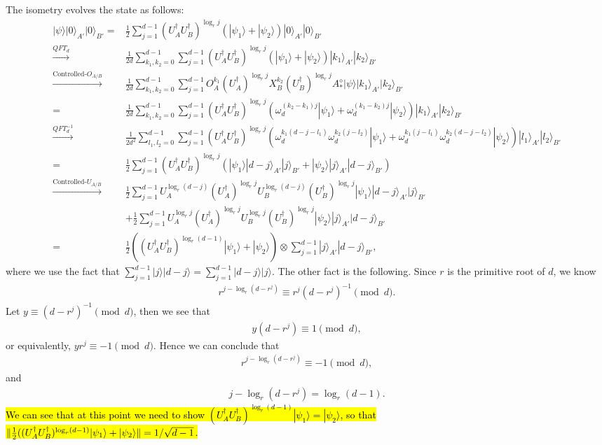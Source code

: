 \documentclass[11pt,letterpaper]{article}
\newcommand{\ket}[1]{|#1\rangle}
\newcommand{\x}{\otimes}
\newcommand{\ct}{^{\dagger}}
\DeclarePairedDelimiter{\norm}{\lVert}{\rVert}
\newcommand{\1}{\mathbb{1}}
\newcommand{\appd}[1]{\simeq_{#1}}
\theoremstyle{definition}
\begin{document}
The isometry evolves the state as follows:
	\begin{align}
		\ket{\psi} \ket{0}_{A'}\ket{0}_{B'} %
		=& \frac{1}{2} \sum_{j=1}^{d-1} (U_A\ct U_B\ct)^{\log_r j} (\ket{\psi_1}+\ket{\psi_2}) \ket{0}_{A'}\ket{0}_{B'}\\
		\xrightarrow[]{QFT_d}& \frac{1}{2d}\sum_{k_1,k_2 = 0}^{d-1} \sum_{j=1}^{d-1} (U_A\ct U_B\ct)^{\log_r j}  (\ket{\psi_1}+\ket{\psi_2}) \ket{k_1}_{A'}\ket{k_2}_{B'}\\
		\xrightarrow[]{\text{Controlled-}O_{A/B}}& \frac{1}{2d}\sum_{k_1,k_2 = 0}^{d-1} \sum_{j=1}^{d-1} O_A^{k_1}(U_A\ct)^{\log_r j} X_B^{k_2}(U_B\ct)^{\log_r j}
		A_\ast^\diamond \ket{\psi} \ket{k_1}_{A'}\ket{k_2}_{B'}\\
		=&\frac{1}{2d} \sum_{k_1,k_2 = 0}^{d-1} \sum_{j=1}^{d-1} (U_A\ct U_B\ct)^{\log_r j}\left(\omega_d^{(k_2-k_1)j}\ket{\psi_1} + \omega_d^{(k_1-k_2)j}\ket{\psi_2}\right) \ket{k_1}_{A'}\ket{k_2}_{B'}\\
		\xrightarrow[]{QFT_d^{-1}} &\frac{1}{2d^2}\sum_{l_1,l_2 = 0}^{d-1}\sum_{j=1}^{d-1} (U_A\ct U_B\ct)^{\log_r j} 
		\left( \omega_d^{k_1(d-j-l_1)}\omega_d^{k_2(j-l_2)}\ket{\psi_1} + \omega_d^{k_1(j-l_1)}\omega_d^{k_2(d-j-l_2)}
		 \ket{\psi_2}\right) \ket{l_1}_{A'}\ket{l_2}_{B'}\\
		= &\frac{1}{2} \sum_{j=1}^{d-1}(U_A\ct U_B\ct)^{\log_r j} \left( \ket{\psi_1} \ket{d-j}_{A'}\ket{j}_{B'} + \ket{\psi_2} \ket{j}_{A'}\ket{d-j}_{B'}\right)\\
		\xrightarrow[]{\text{Controlled-}U_{A/B}}& \frac{1}{2} \sum_{j=1}^{d-1} U_A^{\log_r(d-j)} (U_A\ct)^{\log_r j} U_B^{\log_r (d-j)} (U_B\ct)^{\log_r j} \ket{\psi_1} \ket{d-j}_{A'}\ket{j}_{B'}\\
		&+\frac{1}{2} \sum_{j=1}^{d-1} U_A^{\log_r j} (U_A\ct)^{\log_r j} U_B^{\log_r j} (U_B\ct)^{\log_r j} \ket{\psi_2} \ket{j}_{A'}\ket{d-j}_{B'}\\
		=& \frac{1}{2} ((U_A\ct U_B\ct)^{\log_r (d-1)} \ket{\psi_1}+\ket{\psi_2})\x \sum_{j=1}^{d-1} \ket{j}_{A'}\ket{d-j}_{B'},
	\end{align}
where we use the fact that $\sum_{j=1}^{d-1} \ket{j}\ket{d-j} = \sum_{j=1}^{d-1} \ket{d-j}\ket{j}$.
The other fact is the following. Since $r$ is the primitive root of $d$, we know
\begin{align}
	r^{j-\log_r (d-r^j)} \equiv r^j (d-r^j)^{-1} \pmod{d}.
\end{align}
Let $y \equiv (d-r^j)^{-1} \pmod{d}$, then we see that 
\begin{align}
	y (d-r^j) \equiv 1 \pmod{d},
\end{align}
or equivalently, $y r^j \equiv -1 \pmod{d}$. Hence we can conclude that
\begin{align}
	r^{j - \log_r (d- r^j)} \equiv -1 \pmod{d},
\end{align}
and 
\begin{align}
	j - \log_r (d-r^j) = \log_r (d-1).
\end{align}
\hl{We can see that at this point we need to show $(U_A\ct U_B\ct)^{\log_r (d-1)} \ket{\psi_1} = \ket{\psi_2}$, so that}\\
\hl{$\norm{\frac{1}{2}((U_A\ct U_B\ct)^{\log_r (d-1)} \ket{\psi_1}+ \ket{\psi_2}} = 1/\sqrt{d-1}$. }
\end{document}
